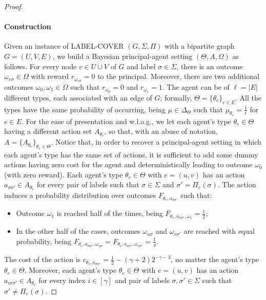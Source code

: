 \begin{proof}
	\paragraph{Construction}
	Given an instance of \textsf{LABEL-COVER} $(G,\Sigma,\Pi)$ with a bipartite graph $G = (U,V,E)$, we build a Bayesian principal-agent setting $(\Theta,A,\Omega)$ as follows.
	For every node $v \in U \cup V$ of $G$ and label $\sigma \in \Sigma$, there is an outcome $\omega_{v  \sigma} \in \Omega$ with reward $r_{\omega_{v  \sigma} } = 0$ to the principal.
	Moreover, there are two additional outcomes $\omega_0, \omega_1 \in \Omega$ such that $r_{\omega_0} = 0$ and $r_{\omega_1} = 1$.
	The agent can be of $\ell = |E|$ different types, each associated with an edge of $G$; formally, $\Theta = \{ \theta_e \}_{e \in E}$.
	All the types have the same probability of occurring, being $\mu \in \Delta_\Theta$ such that $\mu_{\theta_e} = \frac{1}{\ell}$ for $e \in E$.
	For the ease of presentation and w.l.o.g., we let each agent's type $\theta_e \in \Theta$ having a different action set $A_{\theta_e}$, so that, with an abuse of notation, $A = \{ A_{\theta_e} \}_{\theta_e \in \Theta}$.
	Notice that, in order to recover a principal-agent setting in which each agent's type has the same set of actions, it is sufficient to add some dummy actions having zero cost for the agent and deterministically leading to outcome $\omega_0$ (with zero reward).
	Each agent's type $\theta_e \in \Theta$ with $e = (u,v)$ has an action $a_{\sigma  \sigma'} \in A_{\theta_e}$ for every pair of labels such that $\sigma \in \Sigma$ and $\sigma' = \Pi_e(\sigma)$.
	The action induces a probability distribution over outcomes $F_{\theta_e, a_{\sigma  \sigma'} }$ such that:
	\begin{itemize}
		\item Outcome $\omega_1$ is reached half of the times, being $F_{\theta_e, a_{\sigma  \sigma'}, \omega_1 } = \frac{1}{2} $;
		\item In the other half of the cases, outcomes $\omega_{u  \sigma}$ and $\omega_{v  \sigma'}$ are reached with equal probability, being $F_{\theta_e, a_{\sigma  \sigma'}, \omega_{u  \sigma} } = F_{\theta_e, a_{\sigma  \sigma'}, \omega_{v  \sigma'} } = \frac{1}{4} $.
	\end{itemize}
	The cost of the action is $c_{\theta_e, a_{\sigma \sigma'}} = \frac{1}{2}-(\gamma+2) 2^{-\gamma-3}$, no matter the agent's type $\theta_e \in \Theta$.
	Moreover, each agent's type $\theta_e \in \Theta$ with $e = (u,v)$ has an action $a_{i \sigma  \sigma'} \in A_{\theta_e}$ for every index $i \in [\gamma]$ and pair of labels $\sigma, \sigma' \in \Sigma$ such that $ \sigma' \neq  \Pi_e(\sigma) $.

\end{proof}

